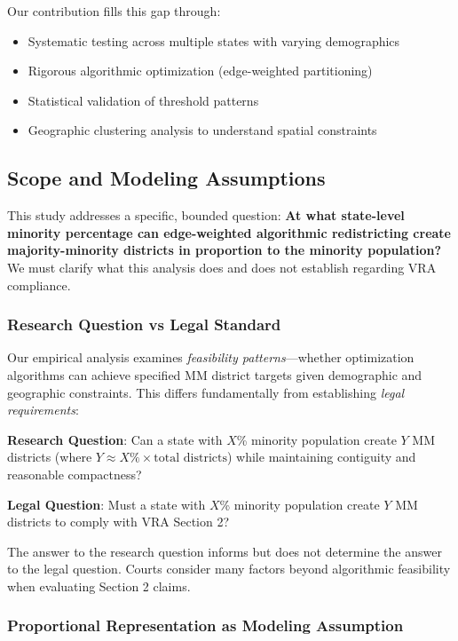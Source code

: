Our contribution fills this gap through:
\begin{itemize}
    \item Systematic testing across multiple states with varying demographics
    \item Rigorous algorithmic optimization (edge-weighted partitioning)
    \item Statistical validation of threshold patterns
    \item Geographic clustering analysis to understand spatial constraints
\end{itemize}

\subsection{Scope and Modeling Assumptions}

This study addresses a specific, bounded question: \textbf{At what state-level minority percentage can edge-weighted algorithmic redistricting create majority-minority districts in proportion to the minority population?} We must clarify what this analysis does and does not establish regarding VRA compliance.

\subsubsection{Research Question vs Legal Standard}

Our empirical analysis examines \emph{feasibility patterns}---whether optimization algorithms can achieve specified MM district targets given demographic and geographic constraints. This differs fundamentally from establishing \emph{legal requirements}:

\textbf{Research Question}: Can a state with $X$\% minority population create $Y$ MM districts (where $Y \approx X\% \times \text{total districts}$) while maintaining contiguity and reasonable compactness?

\textbf{Legal Question}: Must a state with $X$\% minority population create $Y$ MM districts to comply with VRA Section 2?

The answer to the research question informs but does not determine the answer to the legal question. Courts consider many factors beyond algorithmic feasibility when evaluating Section 2 claims.

\subsubsection{Proportional Representation as Modeling Assumption}

